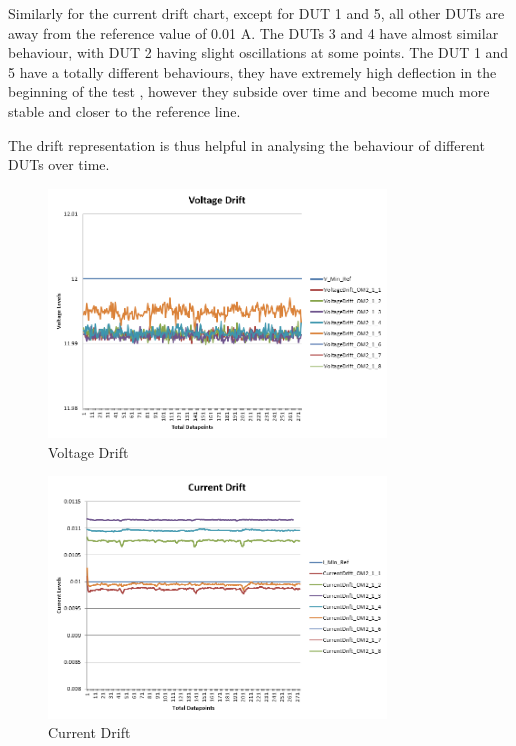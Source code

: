 Similarly for the current drift chart, except for DUT 1 and 5, all other DUTs are away from the reference value of 0.01 A. The DUTs 3 and 4 have almost similar behaviour, with DUT 2 having slight oscillations at some points. The DUT 1 and 5 have a totally different behaviours, they have extremely high deflection in the beginning of the test , however they subside over time and become much more stable and closer to the reference line. 

The drift representation is thus helpful in analysing the behaviour of different DUTs over time. 
\begin{figure}[h]
    	\centering
    	\includegraphics[width= 0.8\textwidth]{images/Voltagedrift.png}
    	\caption [Voltage Drift]{Voltage Drift}  
    	\label{fig:Drift I}
\end{figure}

 

\begin{figure}[h]
    	\centering
    	\includegraphics[width= 0.8\textwidth]{images/Currentdrift.png}
    	\caption [Current Drift]{Current Drift}  
    	\label{fig:Drift II}
\end{figure}
\clearpage

